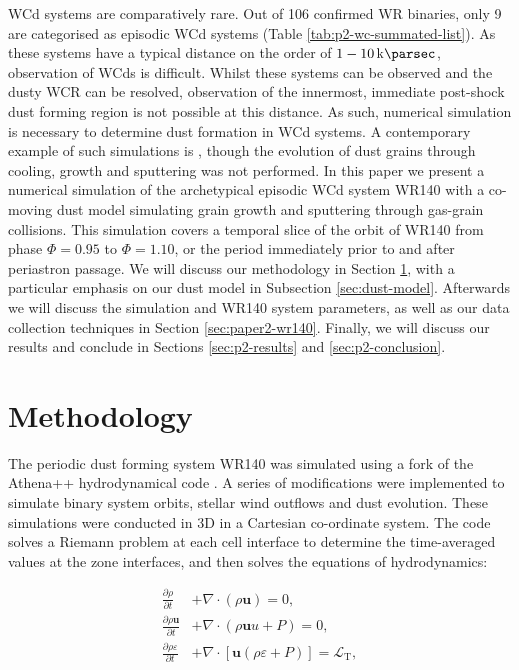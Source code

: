 \documentclass[fleqn,usenatbib]{mnras}
\newcommand{\rms}[1]{\ensuremath{_{\text{#1}}}}
\begin{document}
WCd systems are comparatively rare.
Out of 106 confirmed WR binaries, only 9 are categorised as episodic WCd systems
(Table \ref{tab:p2-wc-summated-list}).
As these systems have a typical distance on the order of $1-10 \, \si{\kilo\parsec}$, observation of WCds is difficult.
Whilst these systems can be observed and the dusty WCR can be resolved, observation of the innermost, immediate post-shock dust forming region is not possible at this distance.
As such, numerical simulation is necessary to determine dust formation in WCd systems.
A contemporary example of such simulations is \cite{hendrix_pinwheels_2016}, though the evolution of dust grains through cooling, growth and sputtering was not performed.
In this paper we present a numerical simulation of the archetypical episodic WCd system WR140 with a co-moving dust model simulating grain growth and sputtering through gas-grain collisions.
This simulation covers a temporal slice of the orbit of WR140 from phase $\Phi = 0.95$ to $\Phi = 1.10$, or the period immediately prior to and after periastron passage.
We will discuss our methodology in Section \ref{sec:paper-2-methodology}, with a particular emphasis on our dust model in Subsection \ref{sec:dust-model}.
Afterwards we will discuss the simulation and WR140 system parameters, as well as our data collection techniques in Section \ref{sec:paper2-wr140}.
Finally, we will discuss our results and conclude in Sections \ref{sec:p2-results} and \ref{sec:p2-conclusion}.

\section{Methodology}
\label{sec:paper-2-methodology}

The periodic dust forming system WR140 was simulated using a fork of the Athena++ hydrodynamical code \citep{stoneAthenaAdaptiveMesh2020}.
A series of modifications were implemented to simulate binary system orbits, stellar wind outflows and dust evolution.
These simulations were conducted in 3D in a Cartesian co-ordinate system.
The code solves a Riemann problem at each cell interface to determine the time-averaged values at the zone interfaces, and then solves the equations of hydrodynamics:

\begin{subequations}
  \begin{align}
    \frac{\partial\rho}{\partial t} & +\nabla \cdot \left(\rho \boldsymbol{u}\right) = 0 , \\
    \frac{\partial \rho \boldsymbol{u}}{\partial t} & + \nabla \cdot \left(\rho \boldsymbol{u} u + P \right) = 0, \\
    \frac{\partial \rho \varepsilon}{\partial t} & + \nabla \cdot \left[ \boldsymbol{u} \left( \rho\varepsilon + P \right) \right] = \mathcal{L}\rms{T} , 
  \end{align}
\end{subequations}
\end{document}
